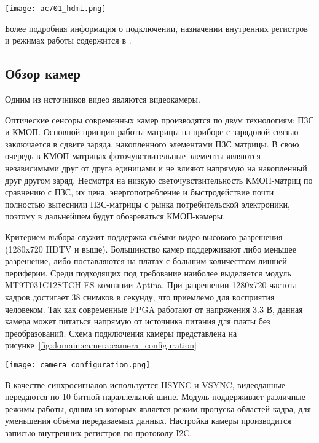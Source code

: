 \begin{center}
  \centering
  \texttt{[image: ac701\_hdmi.png]}
  \label{fig:domain:ac701:hdmi}
\end{center}

Более подробная информация о подключении, назначении внутренних регистров и режимах работы содержится в \cite{adv7511_datasheet}.

\subsection{Обзор камер}
\label{sub:domain:camera}

Одним из источников видео являются видеокамеры.

Оптические сенсоры современных камер производятся по двум технологиям: ПЗС и КМОП.
Основной принцип работы матрицы на приборе с зарядовой связью заключается в сдвиге заряда,
накопленного элементами ПЗС матрицы.
В свою очередь в КМОП-матрицах фоточувствительные элементы являются независимыми друг от друга единицами
и не влияют напрямую на накопленный друг другом заряд.
Несмотря на низкую светочувствительность КМОП-матриц по сравнению с ПЗС, их цена, энергопотребление и
быстродействие почти полностью вытеснили ПЗС-матрицы с рынка потребительской электроники, поэтому
в дальнейшем будут обозреваться КМОП-камеры.

Критерием выбора служит поддержка съёмки видео высокого разрешения (1280x720 HDTV и выше).
Большинство камер поддерживают либо меньшее разрешение, либо поставляются на платах с большим
количеством лишней периферии. Среди подходящих под требование наиболее выделяется модуль
MT9T031C12STCH ES компании Aptina. При разрешении 1280x720 частота кадров достигает 38 снимков в секунду,
что приемлемо для восприятия человеком. Так как современные FPGA работают от напряжения 3.3 В, данная камера
может питаться напрямую от источника питания для платы без преобразований\cite{image_sensor_datasheet}.
Схема подключения камеры представлена на рисунке~\ref{fig:domain:camera:camera_configuration}

\begin{center}
  \centering
  \texttt{[image: camera\_configuration.png]}
  \label{fig:domain:camera:camera_configuration}
\end{center}

В качестве синхросигналов используется HSYNC и VSYNC, видеоданные передаются по 10-битной параллельной шине.
Модуль поддерживает различные режимы работы, одним из которых является режим пропуска областей кадра, для
уменьшения объёма передаваемых данных. Настройка камеры производится записью внутренних регистров по протоколу I2C.

